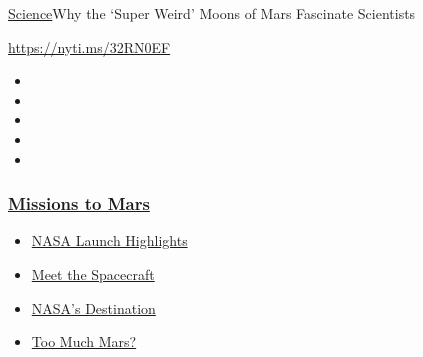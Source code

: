 \href{/section/science}{Science}\textbar{}Why the `Super Weird' Moons of
Mars Fascinate Scientists

\url{https://nyti.ms/32RN0EF}

\begin{itemize}
\item
\item
\item
\item
\item
\end{itemize}

\hypertarget{missions-to-mars}{%
\subsubsection{\texorpdfstring{\href{https://www.nytimes3xbfgragh.onion/news-event/summer-of-mars?name=styln-mars\&region=TOP_BANNER\&variant=undefined\&block=storyline_menu_recirc\&action=click\&pgtype=Article\&impression_id=67539610-e388-11ea-881f-496d10ec9bb8}{Missions
to Mars}}{Missions to Mars}}\label{missions-to-mars}}

\begin{itemize}
\tightlist
\item
  \href{https://www.nytimes3xbfgragh.onion/2020/07/30/science/nasa-mars-launch.html?name=styln-mars\&region=TOP_BANNER\&variant=undefined\&block=storyline_menu_recirc\&action=click\&pgtype=Article\&impression_id=6753bd20-e388-11ea-881f-496d10ec9bb8}{NASA
  Launch Highlights}
\item
  \href{https://www.nytimes3xbfgragh.onion/interactive/2020/science/mars-perseverance-tianwen-hope.html?name=styln-mars\&region=TOP_BANNER\&variant=undefined\&block=storyline_menu_recirc\&action=click\&pgtype=Article\&impression_id=6753bd21-e388-11ea-881f-496d10ec9bb8}{Meet
  the Spacecraft}
\item
  \href{https://www.nytimes3xbfgragh.onion/2020/07/28/science/nasa-jezero-perseverance.html?name=styln-mars\&region=TOP_BANNER\&variant=undefined\&block=storyline_menu_recirc\&action=click\&pgtype=Article\&impression_id=6753bd22-e388-11ea-881f-496d10ec9bb8}{NASA's
  Destination}
\item
  \href{https://www.nytimes3xbfgragh.onion/2020/07/28/science/mars-nasa-science.html?name=styln-mars\&region=TOP_BANNER\&variant=undefined\&block=storyline_menu_recirc\&action=click\&pgtype=Article\&impression_id=6753bd23-e388-11ea-881f-496d10ec9bb8}{Too
  Much Mars?}
\end{itemize}

